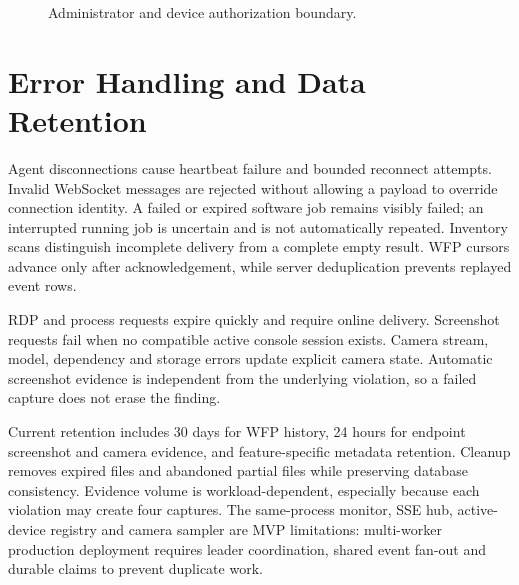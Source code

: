 \documentclass[12pt,a4paper]{report}
\begin{document}
\begin{figure}[H]
\centering
{}
\caption{Administrator and device authorization boundary.}
\label{fig:security-flow}
\end{figure}

\section{Error Handling and Data Retention}
Agent disconnections cause heartbeat failure and bounded reconnect attempts.
Invalid WebSocket messages are rejected without allowing a payload to override
connection identity. A failed or expired software job remains visibly failed;
an interrupted running job is uncertain and is not automatically repeated.
Inventory scans distinguish incomplete delivery from a complete empty result.
WFP cursors advance only after acknowledgement, while server deduplication
prevents replayed event rows.

RDP and process requests expire quickly and require online delivery. Screenshot
requests fail when no compatible active console session exists. Camera stream,
model, dependency and storage errors update explicit camera state. Automatic
screenshot evidence is independent from the underlying violation, so a failed
capture does not erase the finding.

Current retention includes 30 days for WFP history, 24 hours for endpoint
screenshot and camera evidence, and feature-specific metadata retention.
Cleanup removes expired files and abandoned partial files while preserving
database consistency. Evidence volume is workload-dependent, especially
because each violation may create four captures. The same-process monitor,
SSE hub, active-device registry and camera sampler are MVP limitations:
multi-worker production deployment requires leader coordination, shared event
fan-out and durable claims to prevent duplicate work.
\end{document}

